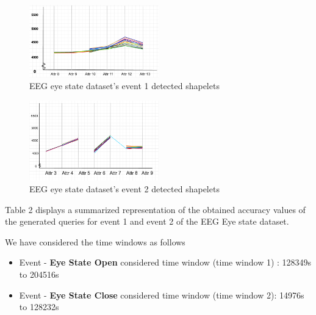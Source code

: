 \documentclass[conference]{IEEEtran}  %
\begin{document}
\begin{figure}[h!]
\includegraphics[width=0.5\textwidth]{EEG_event1.png}
\caption{EEG eye state dataset's event 1 detected shapelets}
\end{figure}

\begin{figure}[h!]
\includegraphics[width=0.5\textwidth]{EEG_event2.png}
\caption{EEG eye state dataset's event 2 detected shapelets}
\end{figure}

Table 2 displays a summarized representation of the obtained accuracy values of the generated queries for event 1 and event 2 of the EEG Eye state dataset.

We have considered the time windows as follows
\begin{itemize}
\item Event - \textbf{Eye State Open} considered time window (time window 1) : 128349s to 204516s
\item Event - \textbf{Eye State Close} considered time window (time window 2):
14976s to 128232s
\end{itemize}
\end{document}
